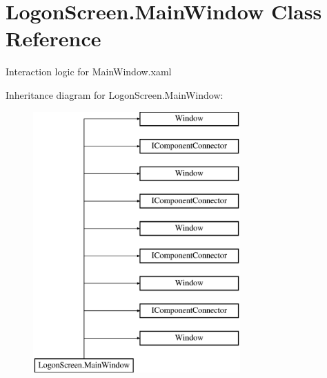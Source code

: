 \hypertarget{class_logon_screen_1_1_main_window}{}\section{Logon\+Screen.\+Main\+Window Class Reference}
\label{class_logon_screen_1_1_main_window}


Interaction logic for Main\+Window.\+xaml  


Inheritance diagram for Logon\+Screen.\+Main\+Window\+:\begin{figure}[H]
\begin{center}
\leavevmode
\includegraphics[height=10.000000cm]{dd/d66/class_logon_screen_1_1_main_window}
\end{center}
\end{figure}
